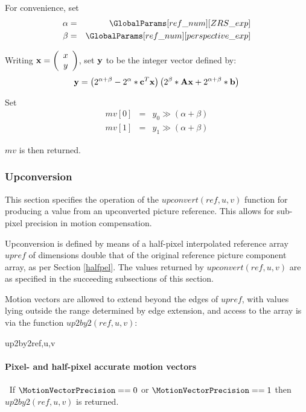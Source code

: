 For convenience, set
\begin{eqnarray*} 
\alpha & = & \GlobalParams[ref\_num][ZRS\_exp] \\
\beta & = & \GlobalParams[ref\_num][perspective\_exp]
\end{eqnarray*}

Writing ${\bf x}=\left( \begin{array}{c} x\\y \end{array}\right)$, set ${\bf y}$ to be
the integer vector defined by:
\begin{equation*}
{\bf y}=\left(2^{\alpha+\beta}-2^\alpha * {\bf c}^T {\bf x}\right)\left(2^\beta*{\bf Ax}+2^{\alpha+\beta}*{\bf b}\right)
\end{equation*}

Set
\begin{eqnarray*}
mv[0] & = & y_0\gg (\alpha+\beta) \\
mv[1] & = & y_1\gg (\alpha+\beta)
\end{eqnarray*}

$mv$ is then returned.

\subsubsection{Upconversion}
\label{upconvert}

This section specifies the operation of the $upconvert(ref, u, v)$ function
for producing a value from an upconverted picture reference. This
allows for sub-pixel precision in motion compensation. 

Upconversion is defined by means of a half-pixel interpolated reference array
$upref$ of dimensions double that of the original reference picture component
array, as per Section \ref{halfpel}. The values returned by $upconvert(ref,u,v)$
are as specified in the succeeding subsections of this section.

Motion vectors are allowed to extend beyond the edges of $upref$, with values lying outside the range determined by edge extension,
and access to the array is via the function $up2by2(ref,u,v)$:

\begin{pseudo}{up2by2}{ref,u,v}
\end{pseudo}

\paragraph{Pixel- and half-pixel accurate motion vectors}
$\ $\newline
If $\MotionVectorPrecision==0$ or $\MotionVectorPrecision==1$ then $up2by2(ref,u,v)$
is returned.

